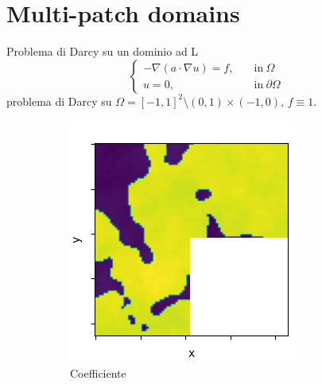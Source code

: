 \documentclass{beamer}
\begin{document}
\section{Multi-patch domains}

\begin{frame}{Problema di Darcy su un dominio ad L}
	\[ 	\begin{cases}
		- \nabla(a \cdot \nabla u) = f,\quad &  \mathrm{in}\ \Omega\\
		u = 0, & \mathrm{in} \ \partial\Omega
	\end{cases} \]
	problema di Darcy su $ \Omega = [-1,1]^2\setminus(0,1)\times (-1,0) $, $ f \equiv 1 $.
	\begin{figure}
		\centering
		\begin{subfigure}{0.36\textwidth}
			\centering
			\includegraphics[width=\textwidth]{CoefficientiL.png}
			\caption{Coefficiente}
		\end{subfigure}
		\hfill
		\begin{subfigure}{0.45\textwidth}
			\centering

\end{subfigure}
\end{figure}
\end{frame}
\end{document}
